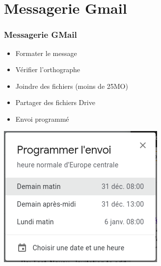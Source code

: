 \documentclass[xcolor=table]{beamer}
\begin{document}
\section{Messagerie Gmail}

\begin{frame}
\frametitle{Messagerie GMail}

\begin{minipage}{0.48\textwidth}
	\begin{itemize}
		\item Formater le message
		\item Vérifier l'orthographe
		\item Joindre des fichiers (moins de 25MO)
		\item Partager des fichiers Drive
		\item Envoi programmé
	\end{itemize}
	\includegraphics[width=.6\textwidth]{..//img/Bweb02-ri-gmail/gmail-sendlater.png}
\end{minipage}
\begin{minipage}{0.48\textwidth}

\end{minipage}
\end{frame}
\end{document}
